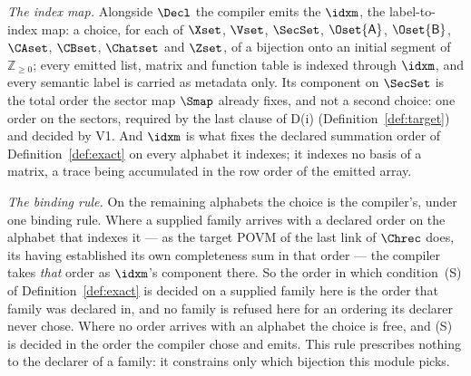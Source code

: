 \begin{definition}
\emph{The index map.} Alongside $\Decl$ the compiler emits the
$\idxm$, the label-to-index map: a choice, for each of $\Xset$, $\Vset$,
$\SecSet$, $\Oset{\mathsf A}$, $\Oset{\mathsf B}$, $\CAset$, $\CBset$,
$\Chatset$ and $\Zset$, of a bijection onto an initial segment of
$\mathbb{Z}_{\ge0}$; every emitted list, matrix and function table is indexed
through $\idxm$, and every semantic label is carried as metadata only. Its
component on $\SecSet$ is the total order the sector map $\Smap$ already
fixes, and not a second choice: one order on the sectors, required by the last
clause of D(i) (Definition~\ref{def:target}) and decided by V1. And $\idxm$ is
what fixes the declared summation order of Definition~\ref{def:exact} on every
alphabet it indexes; it indexes no basis of a matrix, a trace being
accumulated in the row order of the emitted array.

\emph{The binding rule.} On the remaining alphabets the choice is the
compiler's, under one binding rule. Where a supplied family arrives with a
declared order on the alphabet that indexes it --- as the target POVM of the
last link of $\Chrec$ does, its  having established its own
completeness sum in that order --- the compiler takes \emph{that} order as
$\idxm$'s component there. So the order in which condition~(S) of
Definition~\ref{def:exact} is decided on a supplied family here is the order
that family was declared in, and no family is refused here for an ordering
its declarer never chose. Where no order arrives with an alphabet the choice is free, and (S) is
decided in the order the compiler chose and emits. This rule prescribes
nothing to the declarer of a family: it constrains only which bijection this
module picks.


\end{definition}
